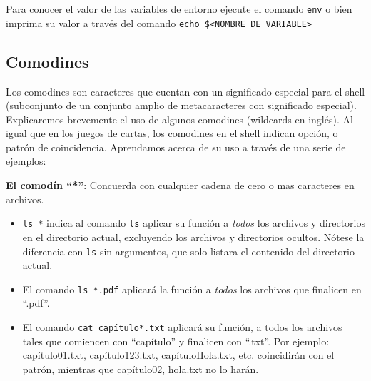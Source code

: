 \documentclass[12pt]{article}
\begin{document}
Para conocer el valor de las variables de entorno ejecute el comando \texttt{env} o bien imprima su valor
a través del comando \texttt{echo \$\textless NOMBRE\_DE\_VARIABLE\textgreater}



\subsection{Comodines}
Los comodines son caracteres que cuentan con un significado especial para el shell (subconjunto de un conjunto 
amplio de metacaracteres con significado especial). 
Explicaremos brevemente el uso de algunos comodines (wildcards en inglés). 
Al igual que en los juegos de cartas, los comodines en el shell indican opción, o patrón de coincidencia. 
Aprendamos acerca de su uso a través de una serie de ejemplos: 

\textbf{El comodín ``*''}:
Concuerda con cualquier cadena de cero o mas caracteres en archivos. 
\begin{itemize}
\item \texttt{ls *} indica al comando \texttt{ls} aplicar su función a \textit{todos} los archivos y 
directorios en el directorio actual, excluyendo los archivos y directorios ocultos. Nótese la diferencia
con \texttt{ls} sin argumentos, que solo listara el contenido del directorio actual. 
\item El comando \texttt{ls *.pdf} aplicará la función a \textit{todos} los archivos que finalicen en ``.pdf''. 
\item El comando \texttt{cat capítulo*.txt} aplicará su función, a todos los archivos tales que comiencen con 
``capítulo'' y finalicen con ``.txt''. Por ejemplo: capítulo01.txt, capítulo123.txt, capítuloHola.txt, etc. coincidirán con el 
patrón, mientras que capítulo02, hola.txt no lo harán.  
\end{itemize} 
\end{document}
